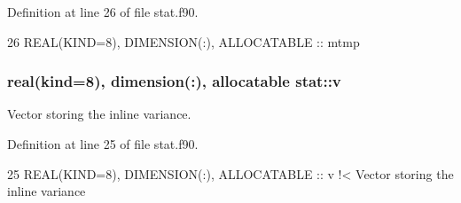 Definition at line 26 of file stat.\+f90.


\begin{DoxyCode}
26   \textcolor{keywordtype}{REAL(KIND=8)}, \textcolor{keywordtype}{DIMENSION(:)}, \textcolor{keywordtype}{ALLOCATABLE} :: mtmp  
\end{DoxyCode}
\subsubsection[{\texorpdfstring{v}{v}}]{\setlength{\rightskip}{0pt plus 5cm}real(kind=8), dimension(\+:), allocatable stat\+::v\hspace{0.3cm}{\ttfamily [private]}}\hypertarget{namespacestat_ab2a3ce8c90189fdbd6bb313c75876473}{}\label{namespacestat_ab2a3ce8c90189fdbd6bb313c75876473}


Vector storing the inline variance. 



Definition at line 25 of file stat.\+f90.


\begin{DoxyCode}
25   \textcolor{keywordtype}{REAL(KIND=8)}, \textcolor{keywordtype}{DIMENSION(:)}, \textcolor{keywordtype}{ALLOCATABLE} :: v\textcolor{comment}{       !< Vector storing the inline variance}
\end{DoxyCode}
